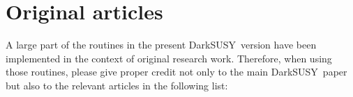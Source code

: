 \documentclass[a4paper,10pt,oneside]{book}
\newcommand{\ds}{{\sffamily DarkSUSY}}
\begin{document}
\chapter{Original articles}
\label{sec:DS_papers}

A large part of the routines in the present \ds\ version have been implemented 
in the context of original research work. Therefore, when using those routines, 
please give proper credit not only to the main \ds\ paper \cite{ds4,ds6} but also
to the relevant articles in the following list:

\bigskip
\end{document}
